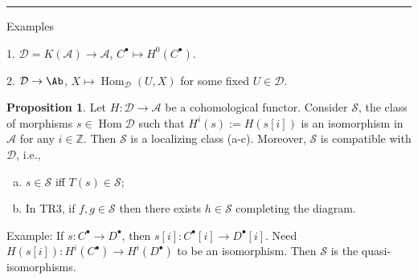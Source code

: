 \documentclass[12pt]{article}
\newcommand{\sepline}{\rule{\textwidth}{0.4pt}}
\theoremstyle{definition}
\newtheorem{proposition}{Proposition}
\newcommand{\Z}{\mathbb{Z}}
\renewcommand{\AA}{\mathcal{A}}
\newcommand{\DD}{\mathcal{D}}
\renewcommand{\SS}{\mathcal{S}}
\newcommand{\<}{\left\langle}
\renewcommand{\>}{\right\rangle}
\DeclareMathOperator{\Hom}{Hom}
\renewcommand{\_}[1]{{_{#1}}}
\begin{document}
\sepline

Examples

1. $\DD = K(\AA) \to \AA$, $C^\bullet \mapsto H^0(C^\bullet)$.

2. $\DD \to \Ab$, $X \mapsto \Hom_\DD(U, X)$ for some fixed $U \in \DD$.

\begin{proposition}
    Let $H : \DD \to \AA$ be a cohomological functor.
    Consider $\SS$, the class of morphisms $s \in \Hom\DD$ such that $H^i(s) := H(s[i])$ is an isomorphism in $\AA$ for any $i \in \Z$.
    Then $\SS$ is a localizing class (a-c).
    Moreover, $\SS$ is compatible with $\DD$, i.e.,
    \begin{enumerate}[(d)]
        \item $s \in \SS$ iff $T(s) \in \SS$;
        \item In TR3, if $f, g \in \SS$ then there exists $h \in \SS$ completing the diagram.
    \end{enumerate}
\end{proposition}

Example: If $s : C^\bullet \to D^\bullet$, then $s[i]  : C^\bullet[i] \to D^\bullet[i]$.
Need $H(s[i]) : H^i(C^\bullet) \to H^i(D^\bullet)$ to be an isomorphism.
Then $\SS$ is the quasi-isomorphisms.
\end{document}
